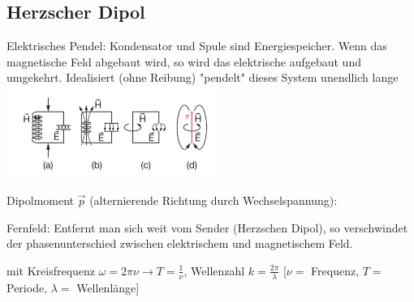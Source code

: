 \subsection{Herzscher Dipol}
    Elektrisches Pendel: Kondensator und Spule sind Energiespeicher.
    Wenn das magnetische Feld abgebaut wird, so wird das elektrische aufgebaut und umgekehrt.
    Idealisiert (ohne Reibung) "pendelt" dieses System unendlich lange
    \centering
    \includegraphics[height = 30mm]{src/images/herzscher_dipol.png}

    Dipolmoment $\vec{p}$ (alternierende Richtung durch Wechselspannung):

    Fernfeld: Entfernt man sich weit vom Sender (Herzschen Dipol), so verschwindet der phasenunterschied zwischen elektrischem und magnetischem Feld.

    mit Kreisfrequenz $\omega = 2 \pi \nu \rightarrow T = \frac{1}{\nu}$, Wellenzahl $k = \frac{2 \pi}{\lambda}$
    [$\nu = $ Frequenz, $T = $ Periode, $\lambda = $ Wellenlänge]
